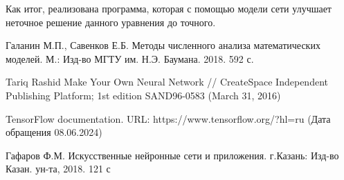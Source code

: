 \documentclass[12pt, a4paper]{article}
\begin{document}
Как итог, реализована программа, которая с помощью модели сети улучшает неточное решение данного уравнения до точного.  
 


\clearpage
\begin{thebibliography}{1}

 Галанин М.П., Савенков Е.Б. Методы численного анализа математических моделей. М.: Изд-во МГТУ им. Н.Э. Баумана. 2018. 592 с.


 Tariq Rashid Make Your Own Neural Network // CreateSpace Independent Publishing Platform; 1st edition SAND96-0583 (March 31, 2016)


 TensorFlow documentation. URL: https://www.tensorflow.org/?hl=ru (Дата обращения 08.06.2024)


 Гафаров Ф.М. Искусственные нейронные сети и приложения. г.Казань: Изд-во Казан. ун-та, 2018. 121 с


\end{thebibliography}
\end{document}
